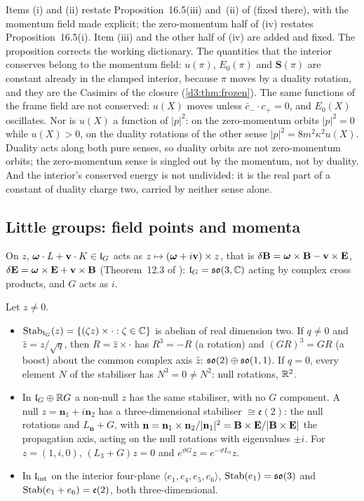 Items (i) and (ii) restate Proposition~16.5(iii) and~(ii) of \cite{ES17} (fixed there), with the momentum field made explicit; the zero-momentum
half of (iv) restates Proposition~16.5(i). Item (iii) and the other half of (iv) are added and fixed. The proposition corrects the working
dictionary. The quantities that the interior conserves belong to the momentum field: $u(\pi)$, $E_0(\pi)$ and $\mathbf S(\pi)$ are constant already
in the clamped interior, because $\pi$ moves by a duality rotation, and they are the Casimirs of the closure (\cref{d3:thm:frozen}). The same
functions of the frame field are not conserved: $u(X)$ moves unless $\bar c_-\cdot c_+=0$, and $E_0(X)$ oscillates. Nor is $u(X)$ a function of
$|p|^2$: on the zero-momentum orbits $|p|^2=0$ while $u(X)>0$, on the duality rotations of the other sense $|p|^2=8m^2\kappa^2u(X)$. Duality acts
along both pure senses, so duality orbits are not zero-momentum orbits; the zero-momentum sense is singled out by the momentum, not by duality.
And the interior's conserved energy is not undivided: it is the real part of a constant of duality charge two, carried by neither sense alone.

\subsection{Little groups: field points and momenta}
\label{d2:sec:little}

On $z$, $\boldsymbol\omega\cdot L+\mathbf v\cdot K\in\mathfrak l_G$ acts as $z\mapsto(\boldsymbol\omega+i\mathbf v)\times z$, that is $\delta\mathbf B=\boldsymbol\omega\times\mathbf B-\mathbf v\times\mathbf E$,
$\delta\mathbf E=\boldsymbol\omega\times\mathbf E+\mathbf v\times\mathbf B$ (Theorem~12.3 of \cite{ES17}): $\mathfrak l_G=\mathfrak{so}(3,\mathbb{C})$ acting by complex cross products, and $G$ acts as $i$.

\begin{theorem}
\label{d2:thm:little}
Let $z\neq0$.
\begin{itemize}
\item[(i)] $\operatorname{Stab}_{\mathfrak l_G}(z)=\{(\zeta z)\times\cdot:\zeta\in\mathbb{C}\}$ is abelian of real dimension two. If $q\neq0$ and $\hat z=z/\sqrt q$, then $R=\hat z\times\cdot$
has $R^3=-R$ (a rotation) and $(GR)^3=GR$ (a boost) about the common complex axis $\hat z$: $\mathfrak{so}(2)\oplus\mathfrak{so}(1,1)$. If $q=0$, every element $N$ of the
stabiliser has $N^3=0\neq N^2$: null rotations, $\mathbb{R}^2$.
\item[(ii)] In $\mathfrak l_G\oplus\mathbb{R} G$ a non-null $z$ has the same stabiliser, with no $G$ component. A null $z=\mathbf n_1+i\mathbf n_2$ has a three-dimensional
stabiliser $\cong\mathfrak e(2)$: the null rotations and $L_{\mathbf n}+G$, with $\mathbf n=\mathbf n_1\times\mathbf n_2/|\mathbf n_1|^2=\mathbf B\times\mathbf E/|\mathbf B\times\mathbf E|$ the
propagation axis, acting on the null rotations with eigenvalues $\pm i$. For $z=(1,i,0)$, $(L_3+G)z=0$ and $e^{\vartheta G}z=e^{-\vartheta L_3}z$.
\item[(iii)] In $\mathfrak l_{\rm int}$ on the interior four-plane $\langle e_1,e_4,e_5,e_6\rangle$, $\operatorname{Stab}(e_1)=\mathfrak{so}(3)$ and $\operatorname{Stab}(e_1+e_6)=\mathfrak e(2)$, both
three-dimensional.
\end{itemize}
\end{theorem}

